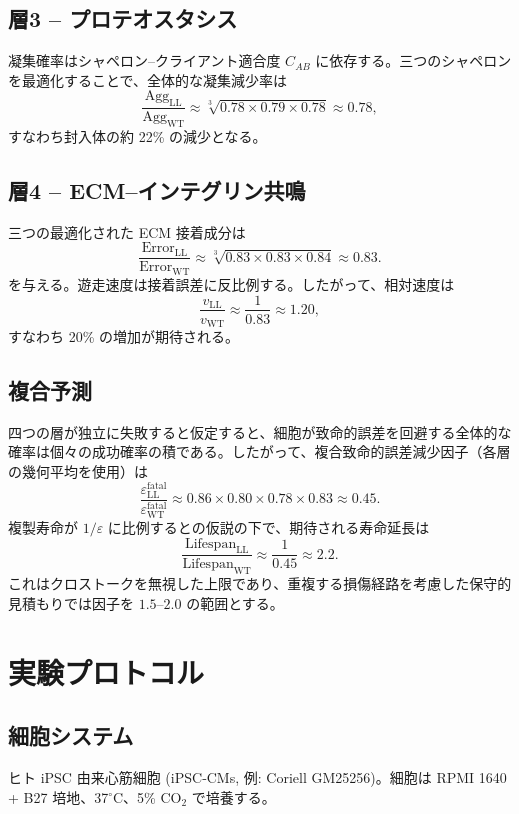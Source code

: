 \documentclass[12pt,a4paper]{ltjsarticle}
\begin{document}
	\subsection{層3 – プロテオスタシス}
	凝集確率はシャペロン–クライアント適合度 \(C_{AB}\) に依存する。三つのシャペロンを最適化することで、全体的な凝集減少率は
	\[
	\frac{\mathrm{Agg}_{\mathrm{LL}}}{\mathrm{Agg}_{\mathrm{WT}}} \approx \sqrt[3]{0.78 \times 0.79 \times 0.78} \approx 0.78,
	\]
	すなわち封入体の約 22\% の減少となる。
	
	\subsection{層4 – ECM–インテグリン共鳴}
	三つの最適化された ECM 接着成分は
	\[
	\frac{\mathrm{Error}_{\mathrm{LL}}}{\mathrm{Error}_{\mathrm{WT}}} \approx \sqrt[3]{0.83 \times 0.83 \times 0.84} \approx 0.83.
	\]
	を与える。遊走速度は接着誤差に反比例する。したがって、相対速度は
	\[
	\frac{v_{\mathrm{LL}}}{v_{\mathrm{WT}}} \approx \frac{1}{0.83} \approx 1.20,
	\]
	すなわち 20\% の増加が期待される。
	
	\subsection{複合予測}
	四つの層が独立に失敗すると仮定すると、細胞が致命的誤差を回避する全体的な確率は個々の成功確率の積である。したがって、複合致命的誤差減少因子（各層の幾何平均を使用）は
	\[
	\frac{\varepsilon_{\mathrm{LL}}^{\mathrm{fatal}}}{\varepsilon_{\mathrm{WT}}^{\mathrm{fatal}}} \approx 0.86 \times 0.80 \times 0.78 \times 0.83 \approx 0.45.
	\]
	複製寿命が \(1/\varepsilon\) に比例するとの仮説の下で、期待される寿命延長は
	\[
	\frac{\mathrm{Lifespan}_{\mathrm{LL}}}{\mathrm{Lifespan}_{\mathrm{WT}}} \approx \frac{1}{0.45} \approx 2.2.
	\]
	これはクロストークを無視した上限であり、重複する損傷経路を考慮した保守的見積もりでは因子を \(1.5\)–\(2.0\) の範囲とする。
	
	\section{実験プロトコル}
	\label{sec:protocol}
	
	\subsection{細胞システム}
	ヒト iPSC 由来心筋細胞 (iPSC‑CMs, 例: Coriell GM25256)。細胞は RPMI 1640 + B27 培地、37\(^\circ\)C、5\% CO\(_2\) で培養する。
	
\end{document}
